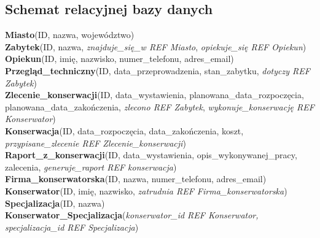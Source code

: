 \documentclass{article}
\begin{document}
\begin{flushleft}
\section{Schemat relacyjnej bazy danych}

\textbf{Miasto}(ID, nazwa, województwo) 
\\
\textbf{Zabytek}(ID, nazwa, \textit{znajduje\_się\_w REF Miasto}, \textit{opiekuje\_się REF Opiekun}) 
\\
\textbf{Opiekun}(ID, imię, nazwisko, numer\_telefonu, adres\_email) 
\\
\textbf{Przegląd\_techniczny}(ID, data\_przeprowadzenia, stan\_zabytku, \textit{dotyczy REF Zabytek})  
\\
\textbf{Zlecenie\_konserwacji}(ID, data\_wystawienia, planowana\_data\_rozpoczęcia, planowana\_data\_zakończenia, \textit{zlecono REF Zabytek}, \textit{wykonuje\_konserwację REF Konserwator}) 
\\
\textbf{Konserwacja}(ID, data\_rozpoczęcia, data\_zakończenia, koszt, \textit{przypisane\_zlecenie REF Zlecenie\_konserwacji}) 
\\
\textbf{Raport\_z\_konserwacji}(ID, data\_wystawienia, opis\_wykonywanej\_pracy, zalecenia, \textit{generuje\_raport REF konserwacja}) 
\\
\textbf{Firma\_konserwatorska}(ID, nazwa, numer\_telefonu, adres\_email) 
\\
\textbf{Konserwator}(ID, imię, nazwisko, \textit{zatrudnia REF Firma\_konserwatorska}) 
\\
\textbf{Specjalizacja}(ID, nazwa) 
\\
\textbf{Konserwator\_Specjalizacja}(\textit{konserwator\_id REF Konserwator, specjalizacja\_id REF Specjalizacja}) 

\end{flushleft}
\end{document}
